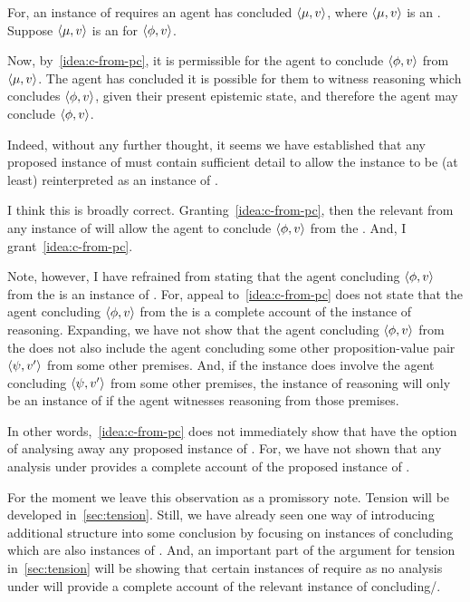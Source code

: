 \begin{note}
  For, an instance of \adB{} requires an agent has concluded \(\langle \mu, v \rangle\), where \(\langle \mu, v \rangle\) is an .
  Suppose \(\langle \mu, v \rangle\) is an  for \(\langle \phi, v \rangle\).

  Now, by~\autoref{idea:c-from-pc}, it is permissible for the agent to conclude \(\langle \phi, v \rangle\) from \(\langle \mu, v \rangle\).
  The agent has concluded it is possible for them to witness reasoning which concludes \(\langle \phi, v \rangle\), given their present epistemic state, and therefore the agent may conclude \(\langle \phi, v \rangle\).

  Indeed, without any further thought, it seems we have established that any proposed instance of \adB{} must contain sufficient detail to allow the instance to be (at least) reinterpreted as an instance of \adA{}.

  I think this is broadly correct.
  Granting~\autoref{idea:c-from-pc}, then the relevant  from any instance of \adB{} will allow the agent to conclude \(\langle \phi, v \rangle\) from the .
  And, I grant~\autoref{idea:c-from-pc}.

  Note, however, I have refrained from stating that the agent concluding \(\langle \phi, v \rangle\) from the  is an instance of \adA{}.
  For, appeal to~\autoref{idea:c-from-pc} does not state that the agent concluding \(\langle \phi, v \rangle\) from the  is a complete account of the instance of reasoning.
  Expanding, we have not show that the agent concluding \(\langle \phi, v \rangle\) from the  does not also include the agent concluding some other proposition-value pair \(\langle \psi, v' \rangle\) from some other premises.
  And, if the instance does involve the agent concluding \(\langle \psi, v' \rangle\) from some other premises, the instance of reasoning will only be an instance of \adA{} if the agent witnesses reasoning from those premises.

  In other words,~\autoref{idea:c-from-pc} does not immediately show that have the option of analysing away any proposed instance of \adB{}.
  For, we have not shown that any analysis under \adA{} provides a complete account of the proposed instance of \adB{}.
\end{note}

\begin{note}
  For the moment we leave this observation as a promissory note.
  Tension will be developed in~\autoref{sec:tension}.
  Still, we have already seen one way of introducing additional structure into some conclusion by focusing on instances of concluding which are also instances of .
  And, an important part of the argument for tension in~\autoref{sec:tension} will be showing that certain instances of \csN{} require \adB{} as no analysis under \adA{} will provide a complete account of the relevant instance of concluding/.
\end{note}


